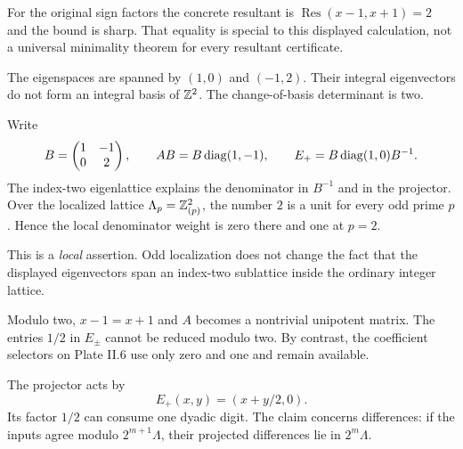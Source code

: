 For the original sign factors the concrete resultant is $\operatorname{Res}(x-1,x+1)=2$ and the bound is sharp. That equality is special to this displayed calculation, not a universal minimality theorem for every resultant certificate.


The eigenspaces are spanned by $(1,0)$ and $(-1,2)$. Their integral eigenvectors do not form an integral basis of $\mathbb Z^2$. The change-of-basis determinant is two.


Write
\[
B=\begin{pmatrix}1&-1\\0&2\end{pmatrix},\qquad
AB=B\operatorname{diag}(1,-1),\qquad
E_+=B\operatorname{diag}(1,0)B^{-1}.
\]
The index-two eigenlattice explains the denominator in $B^{-1}$ and in the projector. Over the localized lattice $\Lambda_p=\mathbb Z_{(p)}^2$, the number $2$ is a unit for every odd prime $p$. Hence the local denominator weight is zero there and one at $p=2$.

This is a \emph{local} assertion. Odd localization does not change the fact that the displayed eigenvectors span an index-two sublattice inside the ordinary integer lattice.

Modulo two, $x-1=x+1$ and $A$ becomes a nontrivial unipotent matrix. The entries $1/2$ in $E_\pm$ cannot be reduced modulo two. By contrast, the coefficient selectors on Plate II.6 use only zero and one and remain available.


The projector acts by
\[
E_+(x,y)=(x+y/2,0).
\]
Its factor $1/2$ can consume one dyadic digit. The claim concerns differences: if the inputs agree modulo $2^{m+1}\Lambda$, their projected differences lie in $2^m\Lambda$.

